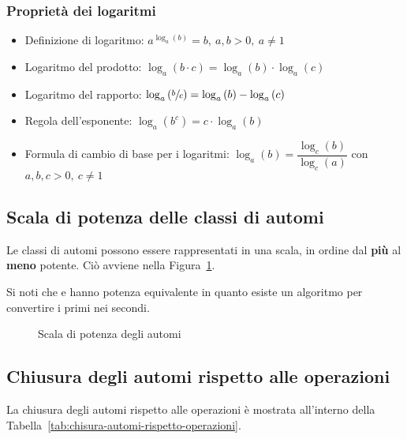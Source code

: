 \documentclass[italian, 10pt]{article}
\begin{document}
\subsubsection{Proprietà dei logaritmi}

\begin{itemize}
  \item Definizione di logaritmo:  \(a^{\log_a{(b)}} = b,\ a, b > 0,\ a \neq 1\)
  \item Logaritmo del prodotto: \(\log_a{(b \cdot c)} = \log_a{(b) \cdot \log_a{(c)}}\)
  \item Logaritmo del rapporto: \(\log_a{\left(\sfrac{b}{c}\right)} = \log_a{(b)} - \log_a{(c)}\)
  \item Regola dell'esponente: \(\log_a{\left(b^c\right)} = c \cdot \log_a{(b)}\)
  \item Formula di cambio di base per i logaritmi: \(\log_a{(b)} = \dfrac{\log_c{(b)}}{\log_c{(a)}}\) con \(a, b, c > 0,\ c \neq 1\)
\end{itemize}

\subsection{Scala di potenza delle classi di automi}

Le classi di automi possono essere rappresentati in una scala, in ordine dal \textbf{più} al \textbf{meno} potente.
Ciò avviene nella Figura~\ref{fig:scala-potenza-automi}.

Si noti che \NFA e \FSA hanno potenza equivalente in quanto esiste un algoritmo per convertire i primi nei secondi.

\begin{figure}[htbp]
  \bigskip
  \centering
  \caption{Scala di potenza degli automi}
  \label{fig:scala-potenza-automi}
  \bigskip
\end{figure}

\subsection{Chiusura degli automi rispetto alle operazioni}

La chiusura degli automi rispetto alle operazioni è mostrata all'interno della Tabella~\ref{tab:chisura-automi-rispetto-operazioni}.
\end{document}

